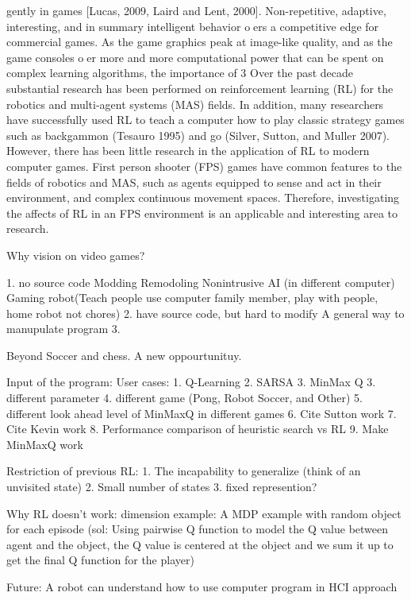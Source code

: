 gently in games [Lucas, 2009, Laird and Lent, 2000]. Non-repetitive, adaptive, interesting,
and in summary intelligent behavior oers a competitive edge for commercial games. As
the game graphics peak at image-like quality, and as the game consoles oer more and more
computational power that can be spent on complex learning algorithms, the importance of
3
Over the past decade substantial research has been
performed on reinforcement learning (RL) for the robotics
and multi-agent systems (MAS) fields. In addition, many
researchers have successfully used RL to teach a computer
how to play classic strategy games such as backgammon
(Tesauro 1995) and go (Silver, Sutton, and Muller 2007).
However, there has been little research in the application of
RL to modern computer games. First person shooter (FPS)
games have common features to the fields of robotics and
MAS, such as agents equipped to sense and act in their
environment, and complex continuous movement spaces.
Therefore, investigating the affects of RL in an FPS
environment is an applicable and interesting area to
research.

Why vision on video games?

1. no source code
Modding
Remodoling
Nonintrusive AI (in different computer)
Gaming robot(Teach people use computer family member, play with people, home robot not chores)
2. have source code, but hard to modify
A general way to manupulate program
3. 



Beyond Soccer and chess. A new oppourtunituy.

Input of the program:
User cases:
1. Q-Learning
2. SARSA
3. MinMax Q
3. different parameter
4. different game (Pong, Robot Soccer, and Other)
5. different look ahead level of MinMaxQ in different games
6. Cite Sutton work
7. Cite Kevin work
8. Performance comparison of heuristic search vs RL
9. Make MinMaxQ work

Restriction of previous RL:
1. The incapability to generalize (think of an unvisited state)
2. Small number of states
3. fixed represention?

Why RL doesn't work:
dimension
example:
A MDP example with random object for each episode
(sol: Using pairwise Q function to model the Q value between agent and the object, the Q value is centered at the object and we sum it up to get the final Q function for the player)

Future:
A robot can understand how to use computer program in HCI approach


